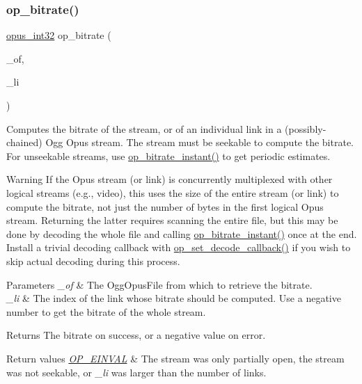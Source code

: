 \subsubsection{\texorpdfstring{op\+\_\+bitrate()}{op\_bitrate()}}
{\footnotesize\ttfamily \hyperlink{opus__types_8h_aa4d309d6f80b99dbabebc8f98879ab9a}{opus\+\_\+int32} op\+\_\+bitrate (\begin{DoxyParamCaption}\item[{\hyperlink{zconf_8h_a2c212835823e3c54a8ab6d95c652660e}{const} Ogg\+Opus\+File $\ast$}]{\+\_\+of,  }\item[{int}]{\+\_\+li }\end{DoxyParamCaption})}

Computes the bitrate of the stream, or of an individual link in a (possibly-\/chained) Ogg Opus stream. The stream must be seekable to compute the bitrate. For unseekable streams, use \hyperlink{group__stream__info_ga7e9e871615055673d5e3c7b4c1dfce80}{op\+\_\+bitrate\+\_\+instant()} to get periodic estimates. \begin{DoxyWarning}{Warning}
If the Opus stream (or link) is concurrently multiplexed with other logical streams (e.\+g., video), this uses the size of the entire stream (or link) to compute the bitrate, not just the number of bytes in the first logical Opus stream. Returning the latter requires scanning the entire file, but this may be done by decoding the whole file and calling \hyperlink{group__stream__info_ga7e9e871615055673d5e3c7b4c1dfce80}{op\+\_\+bitrate\+\_\+instant()} once at the end. Install a trivial decoding callback with \hyperlink{group__stream__decoding_gae0d5b986dff23a82b6002915268ee3d1}{op\+\_\+set\+\_\+decode\+\_\+callback()} if you wish to skip actual decoding during this process. 
\end{DoxyWarning}

\begin{DoxyParams}{Parameters}
{\em \+\_\+of} & The {\ttfamily Ogg\+Opus\+File} from which to retrieve the bitrate. \\
\hline
{\em \+\_\+li} & The index of the link whose bitrate should be computed. Use a negative number to get the bitrate of the whole stream. \\
\hline
\end{DoxyParams}
\begin{DoxyReturn}{Returns}
The bitrate on success, or a negative value on error. 
\end{DoxyReturn}

\begin{DoxyRetVals}{Return values}
{\em \hyperlink{group__error__codes_gae0879acafe9cc0ab72462d291fdb6fb6}{O\+P\+\_\+\+E\+I\+N\+V\+AL}} & The stream was only partially open, the stream was not seekable, or {\itshape \+\_\+li} was larger than the number of links. \\
\hline
\end{DoxyRetVals}
\mbox{\label{group__stream__info_ga7e9e871615055673d5e3c7b4c1dfce80}} 
